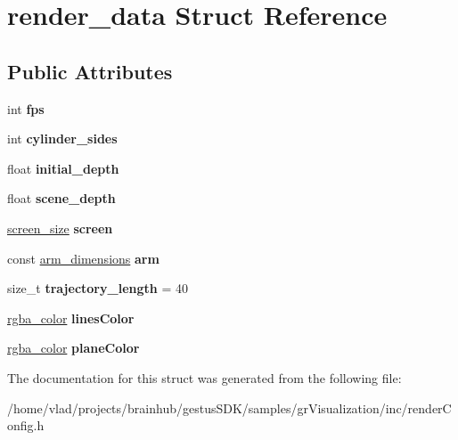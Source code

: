 \hypertarget{structrender__data}{}\section{render\+\_\+data Struct Reference}
\label{structrender__data}
\subsection*{Public Attributes}
\begin{DoxyCompactItemize}
\item 
\mbox{\label{structrender__data_ac95b95f1b479c9a671edd92141037e9d}} 
int {\bfseries fps}
\item 
\mbox{\label{structrender__data_a147c3b5d3c2d3508ee86d1ef60656f28}} 
int {\bfseries cylinder\+\_\+sides}
\item 
\mbox{\label{structrender__data_ae8c5161d20317c3f9b5f129d5a9c358c}} 
float {\bfseries initial\+\_\+depth}
\item 
\mbox{\label{structrender__data_a232ce920f06b62a93c8cca7567601f0c}} 
float {\bfseries scene\+\_\+depth}
\item 
\mbox{\label{structrender__data_a26086c284b441f1b1a8dcfcff72875d4}} 
\mbox{\hyperlink{structscreen__size}{screen\+\_\+size}} {\bfseries screen}
\item 
\mbox{\label{structrender__data_aa524d5b56ef039e93c2f85fe69d7a7af}} 
const \mbox{\hyperlink{structarm__dimensions}{arm\+\_\+dimensions}} {\bfseries arm}
\item 
\mbox{\label{structrender__data_a5eef8813012eda7190e2aa7f273b8a6d}} 
size\+\_\+t {\bfseries trajectory\+\_\+length} = 40
\item 
\mbox{\label{structrender__data_a6ac68255bcfee30dba72b7538ef055f3}} 
\mbox{\hyperlink{structrgba__color}{rgba\+\_\+color}} {\bfseries lines\+Color}
\item 
\mbox{\label{structrender__data_a04272843f2f6bc86384c7e85d4b58c2b}} 
\mbox{\hyperlink{structrgba__color}{rgba\+\_\+color}} {\bfseries plane\+Color}
\end{DoxyCompactItemize}


The documentation for this struct was generated from the following file\+:\begin{DoxyCompactItemize}
\item 
/home/vlad/projects/brainhub/gestus\+S\+D\+K/samples/gr\+Visualization/inc/render\+Config.\+h\end{DoxyCompactItemize}
